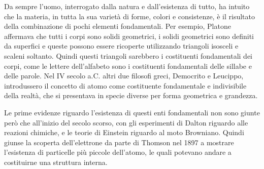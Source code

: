 \documentclass[../main.tex]{subfiles}
\begin{document}
Da sempre l'uomo, interrogato dalla natura e dall'esistenza di tutto, ha intuito che la materia, in tutta la sua varietà di forme, colori e consistenze, è il risultato della combinazione di pochi elementi fondamentali. Per esempio, Platone affermava che tutti i corpi sono solidi geometrici, i solidi geometrici sono definiti da superfici e queste possono essere ricoperte utilizzando triangoli isosceli e scaleni soltanto. Quindi questi triangoli sarebbero i costituenti fondamentali dei corpi, come le lettere dell'alfabeto sono i costituenti fondamentali delle sillabe e delle parole. Nel IV secolo a.C. altri due filosofi greci, Democrito e Leucippo, introdussero il concetto di atomo come costituente fondamentale e indivisibile della realtà, che si presentava in specie diverse per forma geometrica e grandezza.

Le prime evidenze riguardo l'esistenza di questi enti fondamentali non sono giunte però che all'inizio del secolo scorso, con gli esperimenti di Dalton riguardo alle reazioni chimiche, e le teorie di Einstein riguardo al moto Browniano. Quindi giunse la scoperta dell'elettrone da parte di Thomson nel 1897 a mostrare l'esistenza di particelle più piccole dell'atomo, le quali potevano andare a costituirne una struttura interna.
\end{document}

